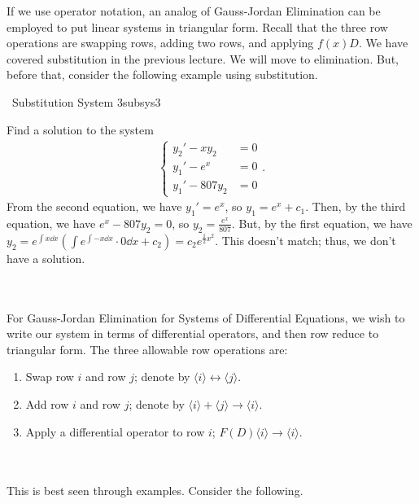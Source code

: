     If we use operator notation, an analog of Gauss-Jordan Elimination can be employed to put linear systems in triangular form. Recall that the three row operations are swapping rows, adding two rows, and applying \(f(x)D\). We have covered substitution in the previous lecture. We will move to elimination. But, before that, consider the following example using substitution.
    \begin{example}{\Difficulty\,\Difficulty\,\,Substitution System 3}{subsys3}

        Find a solution to the system
        \begin{align*}
            \begin{cases}
                y_2'-xy_2&=0 \\
                y_1'-e^x&=0 \\
                y_1'-807y_2&=0
            \end{cases}.
        \end{align*}
        From the second equation, we have \(y_1'=e^x\), so \(y_1=e^x+c_1\). Then, by the third equation, we have \(e^x-807y_2=0\), so \(y_2=\frac{e^x}{807}\). But, by the first equation, we have \(y_2=e^{\int x \dd x}\left(\int e^{\int -x\dd x}\cdot 0\dd x+c_2\right)=c_2e^{\frac{1}{2}x^2}\). This doesn't match; thus, we don't have a solution.
    \end{example}
    \vphantom
    \\
    \\
    For Gauss-Jordan Elimination for Systems of Differential Equations, we wish to write our system in terms of differential operators, and then row reduce to triangular form. The three allowable row operations are:
    \begin{enumerate}
        \item Swap row \(i\) and row \(j\); denote by \(\langle i\rangle\leftrightarrow\langle j\rangle\).
        \item Add row \(i\) and row \(j\); denote by \(\langle i\rangle+\langle j\rangle\to\langle i \rangle\).
        \item Apply a differential operator to row \(i\); \(F(D)\langle i\rangle\to\langle i \rangle\).
    \end{enumerate} 
    \pagebreak
    \vphantom
    \\
    \\
    This is best seen through examples. Consider the following.
